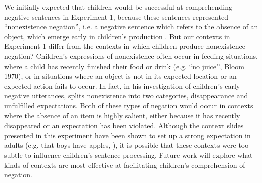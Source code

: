 \documentclass[man]{apa2}
\begin{document}
We initially expected that children would be successful at comprehending negative sentences in Experiment 1, because these sentences represented ``nonexistence negation'', i.e. a negative sentence which refers to the absence of an object, which emerge early in children's production \cite{pea1980, bloom1970}.  But our contexts in Experiment 1 differ from the contexts in which children produce nonexistence negation?  Children's expressions of nonexistence often occur in feeding situations, where a child has recently finished their food or drink (e.g. ``no juice'', Bloom 1970), or in situations where an object is not in its expected location or an expected action fails to occur.  In fact, in his investigation of children's early negative utterances,  splits nonexistence into two categories, disappearance and unfulfilled expectations.  Both of these types of negation would occur in contexts where the absence of an item is highly salient, either because it has recently disappeared or an expectation has been violated.  Although the context slides presented in this experiment have been shown to set up a strong expectation in adults (e.g. that boys have apples, ), it is possible that these contexts were too subtle to influence children's sentence processing.  Future work will explore what kinds of contexts are most effective at facilitating children's comprehension of negation.  
\end{document}

